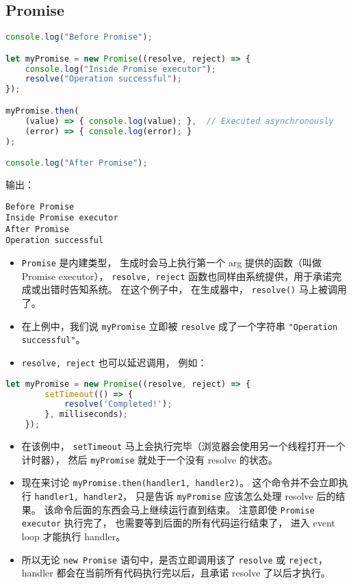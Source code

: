 

\subsection{Promise}
\begin{lstlisting}[language=js]
console.log("Before Promise");

let myPromise = new Promise((resolve, reject) => {
    console.log("Inside Promise executor");
    resolve("Operation successful");
});

myPromise.then(
    (value) => { console.log(value); },  // Executed asynchronously
    (error) => { console.log(error); }
);

console.log("After Promise");
\end{lstlisting}
输出：
\begin{lstlisting}[language=none]
Before Promise
Inside Promise executor
After Promise
Operation successful
\end{lstlisting}

\begin{itemize}
\item \verb`Promise` 是内建类型， 生成时会马上执行第一个 arg 提供的函数（叫做 Promise executor）， \verb`resolve, reject` 函数也同样由系统提供，用于承诺完成或出错时告知系统。 在这个例子中， 在生成器中， \verb`resolve()` 马上被调用了。
\item 在上例中，我们说 \verb`myPromise` 立即被 \verb`resolve` 成了一个字符串 \verb`"Operation successful"`。
\item \verb`resolve, reject` 也可以延迟调用， 例如：
\end{itemize}
\begin{lstlisting}[language=js]
let myPromise = new Promise((resolve, reject) => {
        setTimeout(() => {
            resolve('Completed!');
        }, milliseconds);
    });
\end{lstlisting}
\begin{itemize}
\item 在该例中， \verb`setTimeout` 马上会执行完毕（浏览器会使用另一个线程打开一个计时器）， 然后 \verb`myPromise` 就处于一个没有 resolve 的状态。
\end{itemize}
\begin{itemize}
\item 现在来讨论 \verb`myPromise.then(handler1, handler2)`。 这个命令并不会立即执行 \verb`handler1, handler2`， 只是告诉 \verb`myPromise` 应该怎么处理 resolve 后的结果。 该命令后面的东西会马上继续运行直到结束。 注意即使 \verb`Promise executor` 执行完了， 也需要等到后面的所有代码运行结束了， 进入 event loop 才能执行 handler。
\item 所以无论 \verb`new Promise` 语句中，是否立即调用该了 \verb`resolve` 或 \verb`reject`， handler 都会在当前所有代码执行完以后，且承诺 resolve 了以后才执行。
\end{itemize}

